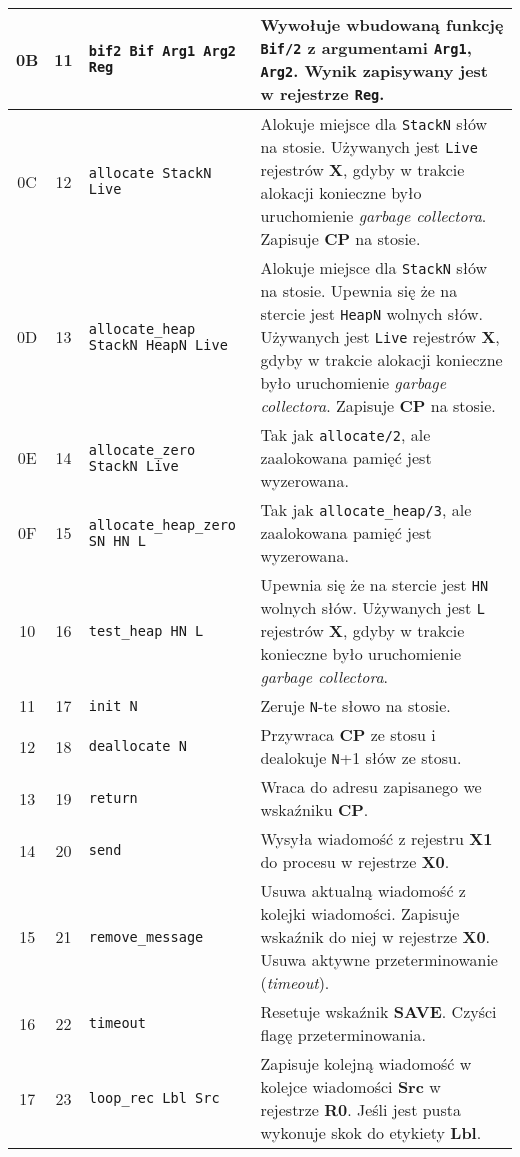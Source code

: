\begin{longtable}{|c|c|p{5cm}|p{7cm}|}
\hline
0B & 11 & \texttt{bif2 Bif Arg1 Arg2 Reg} & Wywołuje wbudowaną funkcję \texttt{Bif/2} z argumentami \texttt{Arg1}, \texttt{Arg2}. Wynik zapisywany jest w rejestrze \texttt{Reg}. \\
\hline
0C & 12 & \texttt{allocate StackN Live} & Alokuje miejsce dla \texttt{StackN} słów na stosie. Używanych jest \texttt{Live} rejestrów \textbf{X}, gdyby w trakcie alokacji konieczne było uruchomienie \emph{garbage collectora}. Zapisuje \textbf{CP} na stosie. \\
\hline
0D & 13 & \texttt{allocate\_heap StackN HeapN Live} & Alokuje miejsce dla \texttt{StackN} słów na stosie. Upewnia się że na stercie jest \texttt{HeapN} wolnych słów. Używanych jest \texttt{Live} rejestrów \textbf{X}, gdyby w trakcie alokacji konieczne było uruchomienie \emph{garbage collectora}. Zapisuje \textbf{CP} na stosie. \\
\hline
0E & 14 & \texttt{allocate\_zero StackN Live} & Tak jak \texttt{allocate/2}, ale zaalokowana pamięć jest wyzerowana. \\
\hline
0F & 15 & \texttt{allocate\_heap\_zero SN HN L} & Tak jak \texttt{allocate\_heap/3}, ale zaalokowana pamięć jest wyzerowana. \\
\hline
10 & 16 & \texttt{test\_heap HN L} & Upewnia się że na stercie jest \texttt{HN} wolnych słów. Używanych jest \texttt{L} rejestrów \textbf{X}, gdyby w trakcie konieczne było uruchomienie \emph{garbage collectora}.\\
\hline
11 & 17 & \texttt{init N} & Zeruje \texttt{N}-te słowo na stosie.\\
\hline
12 & 18 & \texttt{deallocate N} & Przywraca \textbf{CP} ze stosu i dealokuje \texttt{N}+1 słów ze stosu.\\
\hline
13 & 19 & \texttt{return} & Wraca do adresu zapisanego we wskaźniku \textbf{CP}.\\
\hline
14 & 20 & \texttt{send} & Wysyła wiadomość z rejestru \textbf{X1} do procesu w rejestrze \textbf{X0}. \\
\hline
15 & 21 & \texttt{remove\_message} & Usuwa aktualną wiadomość z kolejki wiadomości. Zapisuje wskaźnik do niej w rejestrze \textbf{X0}. Usuwa aktywne przeterminowanie (\emph{timeout}). \\
\hline
16 & 22 & \texttt{timeout} & Resetuje wskaźnik \textbf{SAVE}. Czyści flagę przeterminowania. \\
\hline
17 & 23 & \texttt{loop\_rec Lbl Src} & Zapisuje kolejną wiadomość w kolejce wiadomości \textbf{Src} w rejestrze \textbf{R0}. Jeśli jest pusta wykonuje skok do etykiety \textbf{Lbl}. \\

\end{longtable}
